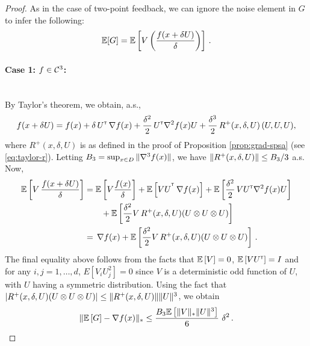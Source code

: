 \begin{proof}
As in the case of two-point feedback, we can ignore the noise element in $G$ to infer the following:
\begin{align*}
\mathbb{E}[G] =  \mathbb{E}\left[ V \left(\dfrac{f(x+\delta U) }{\delta}\right)\right] \,.
\end{align*}

\paragraph{Case 1: $f \in \mathcal{C}^3$:}\ \\
By Taylor's theorem, we obtain, a.s., 
\begin{align*}
f(x + \delta U) =
 f(x) 
 +\delta\,  U^\mathsf{\scriptscriptstyle T}\,\nabla f(x)   
  + \frac{\delta^2}{2}\, U^\mathsf{\scriptscriptstyle T} \nabla^2 f(x) U 
  +  \frac{\delta^3}{2} \, R^{+}(x,\delta,U) \,(U, U, U),
\end{align*}
where $R^{+}(x,\delta,U)$ is as defined in the proof of Proposition \ref{prop:grad-spsa} (see \eqref{eq:taylor-r}).
Letting $B_3 = \sup_{x\in D} \| \nabla^3 f(x) \|$,%
we have $\| R^{+}(x,\delta,U)\| \le B_3/3$ a.s.
Now,
\begin{align*}
\mathbb{E}\left[V\, \dfrac{f(x+\delta U)}{\delta}\right] 
&= \mathbb{E}\left[V \frac{f(x)}{\delta}\right] +  \mathbb{E}\left[VU^{^\mathsf{\scriptscriptstyle T}}  
\, \nabla f(x)\right]  + \mathbb{E}\left[\frac{\delta^2}{2}\, V U^\mathsf{\scriptscriptstyle T} \nabla^2 f(x) U\right] \\
&\qquad+   \mathbb{E}\left[\frac{\delta^2}{2}  V \,R^{+}(x,\delta,U)(U \otimes U \otimes U)\right] 
\\
&= \, \nabla f(x)  + \mathbb{E}\left[\frac{\delta^2}{2}  V \,R^{+}(x,\delta,U)(U \otimes U \otimes U)\right]\,. 
\end{align*}
The final equality above follows from the facts that $\mathbb{E}\left[V\right] = 0$, $\mathbb{E}\left[V U^\mathsf{\scriptscriptstyle T}\right] = I$ and for any $i,j=1,\ldots,d$, $E[V_i U_j^2] = 0$ since $V$ is a deterministic odd function of $U$, with $U$ having a symmetric distribution. 
Using the fact that $|R^{+}(x,\delta,U) (U \otimes U \otimes U)| \le 
\|R^{+}(x,\delta,U)\| \|U\|^3$, 
we obtain
\begin{align*}
\| \mathbb{E}\left[ G \right] - \nabla f(x) \|_* 
\le \frac{B_3 \mathbb{E}\left[ \|V\|_* \|U\|^3 \right]}{6}\,\, \delta^2 \,.
\end{align*}


\end{proof}
